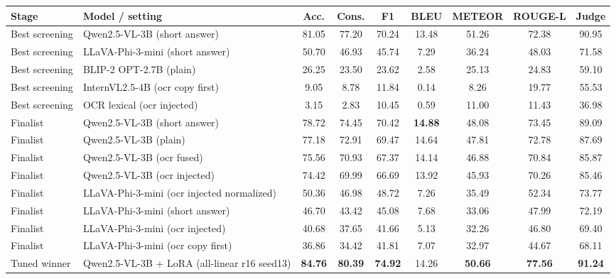 \begin{tabular}{llccccccc}
\toprule
Stage & Model / setting & Acc. & Cons. & F1 & BLEU & METEOR & ROUGE-L & Judge\\
\midrule
Best screening & Qwen2.5-VL-3B (short answer) & 81.05 & 77.20 & 70.24 & 13.48 & 51.26 & 72.38 & 90.95\\
Best screening & LLaVA-Phi-3-mini (short answer) & 50.70 & 46.93 & 45.74 & 7.29 & 36.24 & 48.03 & 71.58\\
Best screening & BLIP-2 OPT-2.7B (plain) & 26.25 & 23.50 & 23.62 & 2.58 & 25.13 & 24.83 & 59.10\\
Best screening & InternVL2.5-4B (ocr copy first) & 9.05 & 8.78 & 11.84 & 0.14 & 8.26 & 19.77 & 55.53\\
Best screening & OCR lexical (ocr injected) & 3.15 & 2.83 & 10.45 & 0.59 & 11.00 & 11.43 & 36.98\\
Finalist & Qwen2.5-VL-3B (short answer) & 78.72 & 74.45 & 70.42 & \textbf{14.88} & 48.08 & 73.45 & 89.09\\
Finalist & Qwen2.5-VL-3B (plain) & 77.18 & 72.91 & 69.47 & 14.64 & 47.81 & 72.78 & 87.69\\
Finalist & Qwen2.5-VL-3B (ocr fused) & 75.56 & 70.93 & 67.37 & 14.14 & 46.88 & 70.84 & 85.87\\
Finalist & Qwen2.5-VL-3B (ocr injected) & 74.42 & 69.99 & 66.69 & 13.92 & 45.93 & 70.26 & 85.46\\
Finalist & LLaVA-Phi-3-mini (ocr injected normalized) & 50.36 & 46.98 & 48.72 & 7.26 & 35.49 & 52.34 & 73.77\\
Finalist & LLaVA-Phi-3-mini (short answer) & 46.70 & 43.42 & 45.08 & 7.68 & 33.06 & 47.99 & 72.19\\
Finalist & LLaVA-Phi-3-mini (ocr injected) & 40.68 & 37.65 & 41.66 & 5.13 & 32.26 & 46.80 & 69.40\\
Finalist & LLaVA-Phi-3-mini (ocr copy first) & 36.86 & 34.42 & 41.81 & 7.07 & 32.97 & 44.67 & 68.11\\
Tuned winner & Qwen2.5-VL-3B + LoRA (all-linear r16 seed13) & \textbf{84.76} & \textbf{80.39} & \textbf{74.92} & 14.26 & \textbf{50.66} & \textbf{77.56} & \textbf{91.24}\\
\bottomrule
\end{tabular}
